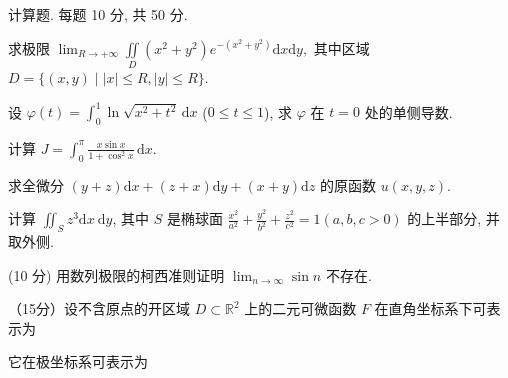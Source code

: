 \par{}
计算题. 每题 10 分, 共 50 分.\par
求极限 $\lim_{R\to +\infty}\iint \limits_{D}(x^{2} + y^{2})e^{-(x^{2} + y^{2})}\mathrm{d}x\mathrm{d}y,$ 其中区域 $D = \{(x,y)\mid |x|\leq R,|y|\leq R\}$.\par
设 $\varphi(t) = \int_0^1 \ln \sqrt{x^2 + t^2} \, \mathrm{d}x$ ($0 \leq t \leq 1$), 求 $\varphi$ 在 $t = 0$ 处的单侧导数.\par
计算 $J = \int_{0}^{\pi} \frac{x \sin x}{1 + \cos^{2} x} \, \mathrm{d}x$.\par
求全微分 $(y + z)\mathrm{d}x + (z + x)\mathrm{d}y + (x + y)\mathrm{d}z$ 的原函数 $u(x,y,z)$.\par
计算 $\iint_{S} z^{3} \mathrm{d}x \mathrm{~d}y$, 其中 $S$ 是椭球面 $\frac{x^{2}}{a^{2}} + \frac{y^{2}}{b^{2}} + \frac{z^{2}}{c^{2}} = 1 (a, b, c > 0)$ 的上半部分, 并取外侧.\par
\par{}
(10 分) 用数列极限的柯西准则证明 $\lim_{n\to \infty}\sin n$ 不存在.\par
\par{}
\par{}
（15分）设不含原点的开区域 $D\subset \mathbb{R}^2$ 上的二元可微函数 $F$ 在直角坐标系下可表示为\par
\nopagebreak[4]
\par{}
它在极坐标系可表示为\par
\nopagebreak[4]

